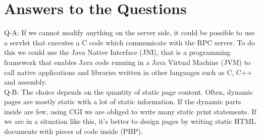 





\maketitle

%
%
%
%
%


\section{Answers to the Questions}
Q-A: If we cannot modify anything on the server side, it could be possible to use a servlet that executes a C code which communicate with the RPC server. To do this we could use the Java Native Interface (JNI), that is a programming framework that enables Java code running in a Java Virtual Machine (JVM) to call native applications and libraries written in other languages such as C, C++ and assembly.\\

Q-B: The choice depends on the quantity of static page content. Often, dynamic pages are mostly static with a lot of static information. If the dynamic parts inside are few, using CGI we are obliged to write many static print statements. If we are in a situation like this, it's better to design pages by writing static HTML documents with pieces of code inside (PHP).\\

